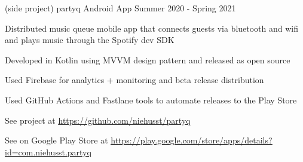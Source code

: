 \documentclass[12pt, a4paper]{awesome-cv}
\begin{document}
\begin{cventries}

  \cventry
    {(side project)}
    {partyq Android App}
    {Summer 2020 - Spring 2021}
    {}
    {
      \begin{cvitems}
        \item{Distributed music queue mobile app that connects guests via bluetooth and wifi and plays music through the Spotify dev SDK}
        \item{Developed in Kotlin using MVVM design pattern and released as open source}
        \item{Used Firebase for analytics + monitoring and beta release distribution}
        \item{Used GitHub Actions and Fastlane tools to automate releases to the Play Store}
        \item{See project at \underline{\href{https://github.com/niehusst/partyq}{https://github.com/niehusst/partyq}}}
        \item{See on Google Play Store at \underline{\href{https://play.google.com/store/apps/details?id=com.niehusst.partyq}{https://play.google.com/store/apps/details?id=com.niehusst.partyq}}}
      \end{cvitems}
    }





\end{cventries}
\end{document}

